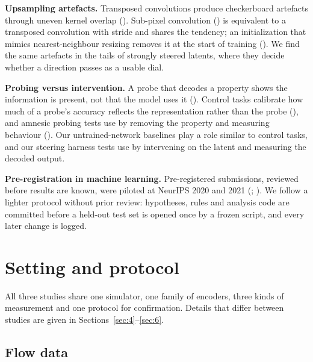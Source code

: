 \documentclass[10pt]{article}
\begin{document}
\textbf{Upsampling artefacts.} Transposed convolutions produce checkerboard artefacts through uneven kernel overlap (\citealp{odena2016deconv}). Sub-pixel convolution (\citealp{shi2016subpixel}) is equivalent to a transposed convolution with stride and shares the tendency; an initialization that mimics nearest-neighbour resizing removes it at the start of training (\citealp{aitken2017checkerboard}). We find the same artefacts in the tails of strongly steered latents, where they decide whether a direction passes as a usable dial.

\textbf{Probing versus intervention.} A probe that decodes a property shows the information is present, not that the model uses it (\citealp{belinkov2022probing}). Control tasks calibrate how much of a probe's accuracy reflects the representation rather than the probe (\citealp{hewitt2019control}), and amnesic probing tests use by removing the property and measuring behaviour (\citealp{elazar2021amnesic}). Our untrained-network baselines play a role similar to control tasks, and our steering harness tests use by intervening on the latent and measuring the decoded output.

\textbf{Pre-registration in machine learning.} Pre-registered submissions, reviewed before results are known, were piloted at NeurIPS 2020 and 2021 (\citealp{bertinetto2021prereg}; \citealp{albanie2022prereg}). We follow a lighter protocol without prior review: hypotheses, rules and analysis code are committed before a held-out test set is opened once by a frozen script, and every later change is logged.

\section{Setting and protocol}\label{sec:3}

All three studies share one simulator, one family of encoders, three kinds of measurement and one protocol for confirmation. Details that differ between studies are given in Sections~\ref{sec:4}--\ref{sec:6}.

\subsection{Flow data}\label{sec:3.1}
\end{document}
